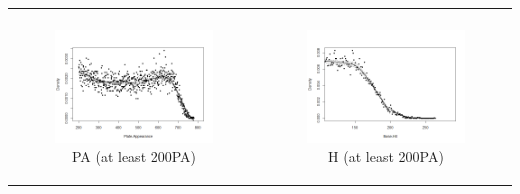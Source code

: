 \documentclass[dvipdfmx, 12pt]{article}
\begin{document}
\begin{tabular}{cc}
\begin{minipage}[H]{0.5\textwidth}
  \end{minipage}\\
  \begin{minipage}[H]{0.5\textwidth}
    \begin{figure}[H]
      \centering
      \includegraphics[keepaspectratio, scale = 0.5, angle = 90]
      {graphs/PA_500.png}
      \caption{PA (at least 200PA)}
      \label{PA_500}
    \end{figure}

  \end{minipage}&
  \begin{minipage}[H]{0.5\textwidth}
    \begin{figure}[H]
      \centering
      \includegraphics[keepaspectratio, scale = 0.5, angle = 90]
      {graphs/H_200.png}
      \caption{H (at least 200PA)}
      \label{H_200}
    \end{figure}

  \end{minipage}
\end{tabular}
\end{document}
